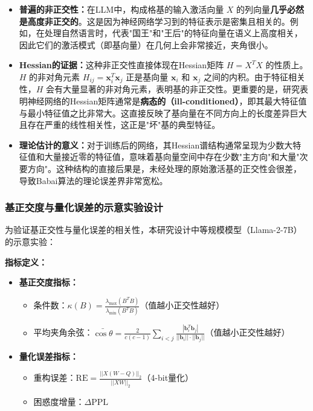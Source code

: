 \documentclass[letterpaper,twocolumn,10pt]{article}
\begin{document}
\begin{itemize}
\item \textbf{普遍的非正交性：}在LLM中，构成格基的输入激活向量 $X$ 的列向量\textbf{几乎必然是高度非正交的}。这是因为神经网络学习到的特征表示是密集且相关的。例如，在处理自然语言时，代表"国王"和"王后"的特征向量在语义上高度相关，因此它们的激活模式（即基向量）在几何上会非常接近，夹角很小。

\item \textbf{Hessian的证据：}这种非正交性直接体现在Hessian矩阵 $H = X^T X$ 的性质上。$H$ 的非对角元素 $H_{ij} = \mathbf{x}_i^T \mathbf{x}_j$ 正是基向量 $\mathbf{x}_i$ 和 $\mathbf{x}_j$ 之间的内积。由于特征相关性，$H$ 会有大量显著的非对角元素，表明基的非正交性。更重要的是，研究表明神经网络的Hessian矩阵通常是\textbf{病态的（ill-conditioned）}，即其最大特征值与最小特征值之比非常大。这直接反映了基向量在不同方向上的长度差异巨大且存在严重的线性相关性，这正是"坏"基的典型特征。

\item \textbf{理论估计的意义：}对于训练后的网络，其Hessian谱结构通常呈现为少数大特征值和大量接近零的特征值，意味着基向量空间中存在少数"主方向"和大量"次要方向"。这种结构的直接后果是，未经处理的原始激活基的正交性会很差，导致Babai算法的理论误差界非常宽松。
\end{itemize}

\subsubsection{基正交度与量化误差的示意实验设计}

为验证基正交性与量化误差的相关性，本研究设计中等规模模型（Llama-2-7B）的示意实验：

\textbf{指标定义：}
\begin{itemize}
\item \textbf{基正交度指标：}
\begin{itemize}
\item 条件数：$\kappa(B) = \frac{\lambda_{\text{max}}(B^T B)}{\lambda_{\text{min}}(B^T B)}$（值越小正交性越好）
\item 平均夹角余弦：$\bar{\cos\theta} = \frac{2}{c(c-1)}\sum_{i<j} \frac{|\mathbf{b}_i^T \mathbf{b}_j|}{||\mathbf{b}_i||\cdot||\mathbf{b}_j||}$（值越小正交性越好）
\end{itemize}
\item \textbf{量化误差指标：}
\begin{itemize}
\item 重构误差：$\text{RE} = \frac{||X(W - Q)||_2}{||XW||_2}$（4-bit量化）
\item 困惑度增量：$\Delta \text{PPL}$
\end{itemize}
\end{itemize}
\end{document}
